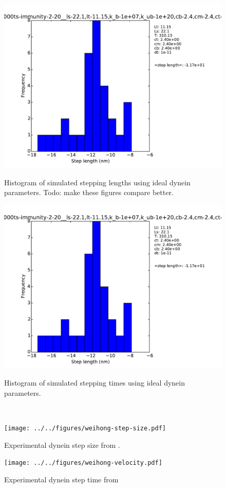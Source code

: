 \documentclass[10pt]{article} %
\begin{document}
\begin{figure}[H]
  \centering
  \begin{minipage}[b]{0.45\textwidth}
    \includegraphics[width=\textwidth]{../../figures/length_histogram_sample.pdf}
    \caption{Histogram of simulated stepping lengths using ideal dynein parameters. Todo: make these figures compare better.}
  \end{minipage}
  \hspace{.1cm}
  \begin{minipage}[b]{0.45\textwidth}
    \includegraphics[width=\textwidth]{../../figures/time_histogram_sample.pdf}
    \caption{Histogram of simulated stepping times using ideal dynein parameters.}
  \end{minipage}\\
  \begin{minipage}[b]{0.45\textwidth}
    \texttt{[image: ../../figures/weihong-step-size.pdf]}
    \caption{Experimental dynein step size from \cite{weihongpaper}.}
  \end{minipage}
  \hspace{.1cm}
  \begin{minipage}[b]{0.45\textwidth}
    \texttt{[image: ../../figures/weihong-velocity.pdf]}
    \caption{Experimental dynein step time from \cite{weihongpaper}}
  \end{minipage}
  \label{fig:final-histograms}
\end{figure}
\end{document}
